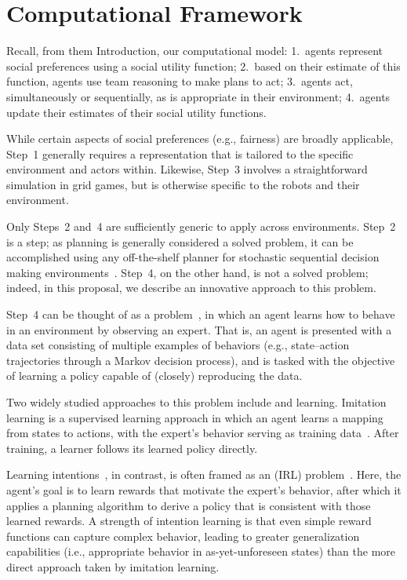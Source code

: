 
\section{Computational Framework}
\label{sec:process}

Recall, from them Introduction, our computational model:
1.~agents represent social preferences using a social utility function;
2.~based on their estimate of this function, agents use team reasoning to make plans to act;
3.~agents act, simultaneously or sequentially, as is appropriate in their environment;
4.~agents update their estimates of their social utility functions.

While certain aspects of social preferences (e.g., fairness) are broadly applicable,
Step~1 generally requires a representation that is tailored to the specific environment and actors within.
Likewise, Step~3 involves a straightforward simulation in grid games, but is
otherwise specific to the robots and their environment.

Only Steps~2 and~4 are sufficiently generic to apply across
environments.  Step~2 is a  step; as planning is
generally considered a solved problem, it can be accomplished using any off-the-shelf planner for
stochastic sequential decision making
environments~\cite{Barto95,bellman57,boutilier99,collins95,kearns99b,kocsis06}.
%
Step~4, on the other hand, is not a solved problem; indeed, in this
proposal,
we describe an innovative approach to this problem.

Step~4 can be thought of as a 
problem~\cite{argall09}, in which an agent learns how to behave in an
environment by observing an expert.  That is, an agent is presented
with a data set consisting of multiple examples of behaviors (e.g.,
state--action trajectories through a Markov decision process), and is
tasked with the objective of learning a policy capable of (closely)
reproducing the data.

Two widely studied approaches to this problem include
 and  learning.  Imitation learning
is a supervised learning approach in which an agent learns a mapping
from states to actions, with the expert's behavior serving as training
data~\cite{pomerleau93}.  After training, a learner follows its
learned policy directly.

Learning intentions~\cite{macglashan15b}, in contrast, is often framed
as an  (IRL)
problem~\cite{babes11,ng00}.  Here, the agent's goal is to learn
rewards that motivate the expert's behavior, after which it applies a
planning algorithm to derive a policy that is consistent with those
learned rewards.  A strength of intention learning is that even simple
reward functions can capture complex behavior, leading to greater
generalization capabilities (i.e., appropriate behavior in
as-yet-unforeseen states) than the more direct approach taken by
imitation learning.

